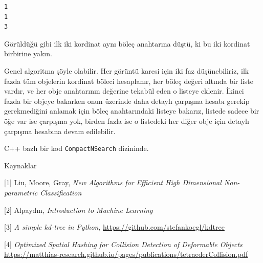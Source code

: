 \documentclass[12pt,fleqn]{article}\usepackage{../../common}
\begin{document}
\begin{verbatim}
1
1
3
\end{verbatim}

Görüldüğü gibi ilk iki kordinat aynı böleç anahtarına düştü, ki bu iki kordinat
birbirine yakın.

Genel algoritma şöyle olabilir. Her görüntü karesi için iki faz düşünebiliriz,
ilk fazda tüm objelerin kordinat böleci hesaplanır, her böleç değeri altında bir
liste vardır, ve her obje anahtarının değerine tekabül eden o listeye
eklenir. İkinci fazda bir objeye bakarken onun üzerinde daha detaylı çarpışma
hesabı gerekip gerekmediğini anlamak için böleç anahtarındaki listeye bakarız,
listede sadece bir öğe var ise çarpışma yok, birden fazla ise o listedeki her
diğer obje için detaylı çarpışma hesabına devam edilebilir.

C++ bazlı bir kod \verb!CompactNSearch! dizininde. 

Kaynaklar

[1] Liu, Moore, Gray, {\em New Algorithms for Efficient High Dimensional
  Non-parametric Classification}

[2] Alpaydın, {\em Introduction to Machine Learning}

[3] {\em A simple kd-tree in Python}, \url{https://github.com/stefankoegl/kdtree}

[4] {\em Optimized Spatial Hashing for Collision Detection of Deformable Objects}
    \url{https://matthias-research.github.io/pages/publications/tetraederCollision.pdf}
\end{document}
